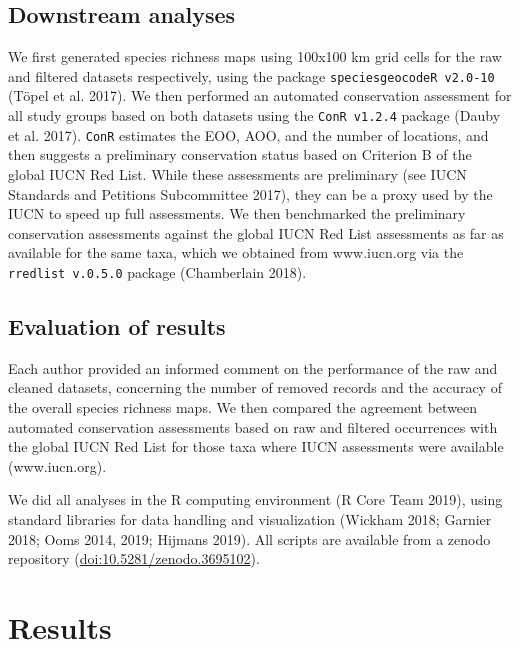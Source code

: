 \documentclass[fleqn,10pt,lineno]{wlpeerj} %
\begin{document}
\hypertarget{downstream-analyses}{%
\subsection*{Downstream analyses}\label{downstream-analyses}}

We first generated species richness maps using 100x100 km grid cells for the raw and filtered datasets respectively, using the package \texttt{speciesgeocodeR\ v2.0-10} (Töpel et al. 2017). We then performed an automated conservation assessment for all study groups based on both datasets using the \texttt{ConR\ v1.2.4} package (Dauby et al. 2017). \texttt{ConR} estimates the EOO, AOO, and the number of locations, and then suggests a preliminary conservation status based on Criterion B of the global IUCN Red List. While these assessments are preliminary (see IUCN Standards and Petitions Subcommittee 2017), they can be a proxy used by the IUCN to speed up full assessments. We then benchmarked the preliminary conservation assessments against the global IUCN Red List assessments as far as available for the same taxa, which we obtained from www.iucn.org via the \texttt{rredlist\ v.0.5.0} package (Chamberlain 2018).

\hypertarget{evaluation-of-results}{%
\subsection*{Evaluation of results}\label{evaluation-of-results}}

Each author provided an informed comment on the performance of the raw and cleaned datasets, concerning the number of removed records and the accuracy of the overall species richness maps. We then compared the agreement between automated conservation assessments based on raw and filtered occurrences with the global IUCN Red List for those taxa where IUCN assessments were available (www.iucn.org).

We did all analyses in the R computing environment (R Core Team 2019), using standard libraries for data handling and visualization (Wickham 2018; Garnier 2018; Ooms 2014, 2019; Hijmans 2019). All scripts are available from a zenodo repository (\url{doi:10.5281/zenodo.3695102}).

\hypertarget{results}{%
\section*{Results}\label{results}}
\end{document}
